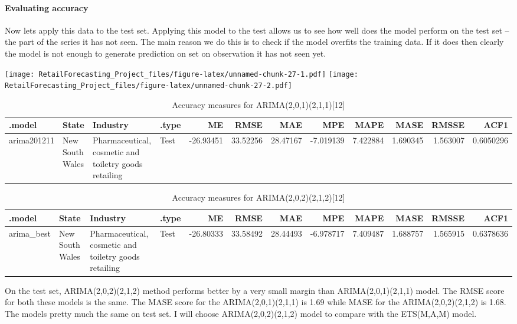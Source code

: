 \documentclass[
]{article}
\begin{document}
\hypertarget{evaluating-accuracy}{%
\paragraph{Evaluating accuracy}\label{evaluating-accuracy}}

Now lets apply this data to the test set. Applying this model to the
test allows us to see how well does the model perform on the test set --
the part of the series it has not seen. The main reason we do this is to
check if the model overfits the training data. If it does then clearly
the model is not enough to generate prediction on set on observation it
has not seen yet.

\texttt{[image: RetailForecasting\_Project\_files/figure-latex/unnamed-chunk-27-1.pdf]}
\texttt{[image: RetailForecasting\_Project\_files/figure-latex/unnamed-chunk-27-2.pdf]}

\begin{table}

\caption{\label{tab:unnamed-chunk-27}Accuracy measures for ARIMA(2,0,1)(2,1,1)[12]}
\centering
\begin{tabular}[t]{l|l|l|l|r|r|r|r|r|r|r|r}
\hline
.model & State & Industry & .type & ME & RMSE & MAE & MPE & MAPE & MASE & RMSSE & ACF1\\
\hline
arima201211 & New South Wales & Pharmaceutical, cosmetic and toiletry goods retailing & Test & -26.93451 & 33.52256 & 28.47167 & -7.019139 & 7.422884 & 1.690345 & 1.563007 & 0.6050296\\
\hline
\end{tabular}
\end{table}

\begin{table}

\caption{\label{tab:unnamed-chunk-27}Accuracy measures for ARIMA(2,0,2)(2,1,2)[12]}
\centering
\begin{tabular}[t]{l|l|l|l|r|r|r|r|r|r|r|r}
\hline
.model & State & Industry & .type & ME & RMSE & MAE & MPE & MAPE & MASE & RMSSE & ACF1\\
\hline
arima\_best & New South Wales & Pharmaceutical, cosmetic and toiletry goods retailing & Test & -26.80333 & 33.58492 & 28.44493 & -6.978717 & 7.409487 & 1.688757 & 1.565915 & 0.6378636\\
\hline
\end{tabular}
\end{table}

On the test set, ARIMA(2,0,2)(2,1,2) method performs better by a very
small margin than ARIMA(2,0,1)(2,1,1) model. The RMSE score for both
these models is the same. The MASE score for the ARIMA(2,0,1)(2,1,1) is
1.69 while MASE for the ARIMA(2,0,2)(2,1,2) is 1.68. The models pretty
much the same on test set. I will choose ARIMA(2,0,2)(2,1,2) model to
compare with the ETS(M,A,M) model.
\end{document}
